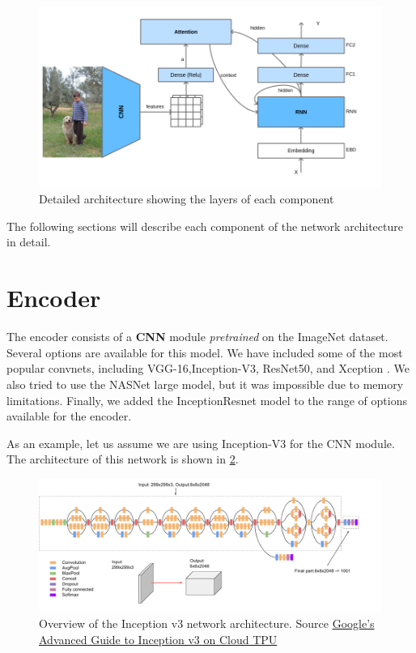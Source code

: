 \begin{figure}[hpt]
	\centering
	\includegraphics[scale=0.5]{images/ch4/overall-architecture.png}
	\caption{Detailed architecture showing the layers of each component}
	\label{fig:overall-architecture}
\end{figure}


The following sections will describe each component of the network architecture in detail.

\section{Encoder}\label{sec:encoder}

The encoder consists of a \textbf{CNN} module \textit{pretrained} on the ImageNet dataset. Several options are available for this model. We have included some of the most popular convnets, including VGG-16\citep{Simonyan2015},Inception-V3\citep{Szegedy2016}, ResNet50\citep{He2016resnet}, and Xception \citep{Chollet2017}. We also tried to use the NASNet \citep{Zoph2018} large model, but it was impossible due to memory limitations. Finally, we added the InceptionResnet \citet{Szegedy2016} model to the range of options available for the encoder.

As an example, let us assume we are using Inception-V3 for the CNN module. The architecture of this network is shown in \cref{fig:inceptionv3}.

\begin{figure}[hpt]
	\centering
	\includegraphics[scale=0.5]{images/ch4/inceptionv3.png}
	\caption{Overview of the Inception v3 network architecture. Source \href{https://cloud.google.com/tpu/docs/inception-v3-advanced}{Google's Advanced Guide to Inception v3 on Cloud TPU}}
	\label{fig:inceptionv3}
\end{figure}

